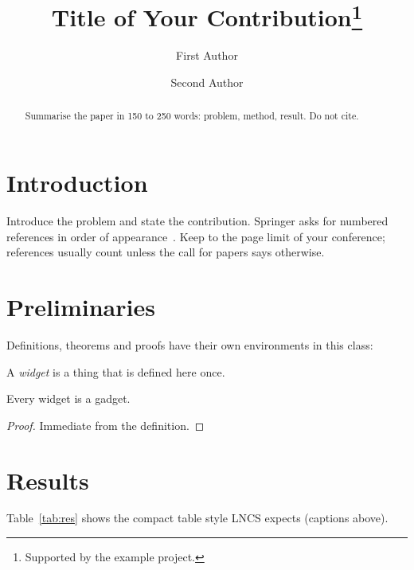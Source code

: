 \documentclass[runningheads]{llncs}
\begin{document}
\title{Title of Your Contribution\thanks{Supported by the example project.}}

\author{First Author \and
Second Author}


\maketitle

\begin{abstract}
Summarise the paper in 150 to 250 words: problem, method, result. Do not cite.
\end{abstract}

\section{Introduction}
Introduce the problem and state the contribution. Springer asks for numbered
references in order of appearance~\cite{knuth84}. Keep to the page limit of your
conference; references usually count unless the call for papers says otherwise.

\section{Preliminaries}
Definitions, theorems and proofs have their own environments in this class:

\begin{definition}
A \emph{widget} is a thing that is defined here once.
\end{definition}

\begin{theorem}\label{thm:main}
Every widget is a gadget.
\end{theorem}
\begin{proof}
Immediate from the definition.
\end{proof}

\section{Results}
Table~\ref{tab:res} shows the compact table style LNCS expects (captions above).
\end{document}
